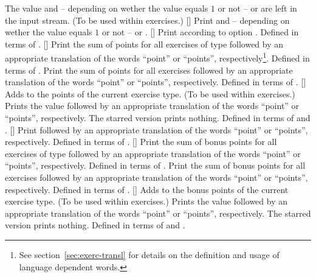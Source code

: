 \documentclass{xsim-manual}
\begin{document}
\begin{commands}
    The value and -- depending on wether the value equals $1$ or not --
     or  are left in the input stream. (To be used
    within exercises.)
  []
    Print  and -- depending on wether the value equals $1$ or not --
     or .
  []
    Print  according to option .  Defined in
    terms of .
  []
    Print the sum of points for all exercises of type  followed by
    an appropriate translation of the words \enquote{point} or
    \enquote{points}, respectively\footnote{See section~\vref{sec:exerc-transl}
      for details on the definition and usage of language dependent words.}.
    Defined in terms of .
    Print the sum of points for all exercises followed by an appropriate
    translation of the words \enquote{point} or \enquote{points},
    respectively.  Defined in terms of .
  [\sarg{}]
    Adds  to the points of the current exercise type. (To be used
    within exercises.)  Prints the value followed by an appropriate
    translation of the words \enquote{point} or \enquote{points},
    respectively.  The starred version prints nothing.  Defined in terms of
     and .
  []
    Print  followed by an appropriate translation of the words
    \enquote{point} or \enquote{points}, respectively.  Defined in terms of
    .
  []
    Print the sum of bonus points for all exercises of type 
    followed by an appropriate translation of the words \enquote{point} or
    \enquote{points}, respectively.  Defined in terms of
    .
    Print the sum of bonus points for all exercises followed by an appropriate
    translation of the words \enquote{point} or \enquote{points},
    respectively.  Defined in terms of .
  [\sarg{}]
    Adds  to the bonus points of the current exercise type. (To be
    used within exercises.)  Prints the value followed by an appropriate
    translation of the words \enquote{point} or \enquote{points},
    respectively.  The starred version prints nothing.  Defined in terms of
     and .
\end{commands}
\end{document}
